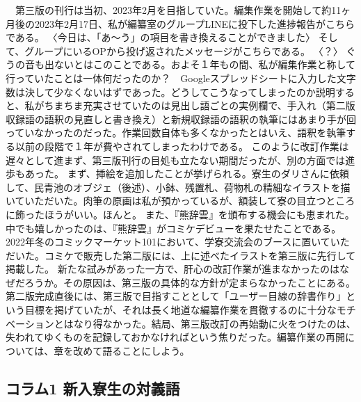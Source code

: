 　第三版の刊行は当初、2023年2月を目指していた。編集作業を開始して約11ヶ月後の2023年2月17日、私が編纂室のグループLINEに投下した進捗報告がこちらである。
〈今日は、「あ〜う」の項目を書き換えることができました〉
そして、グループにいるOPから投げ返されたメッセージがこちらである。
〈？〉
ぐうの音も出ないとはこのことである。およそ１年もの間、私が編集作業と称して行っていたことは一体何だったのか？　Googleスプレッドシートに入力した文字数は決して少なくないはずであった。どうしてこうなってしまったのか説明すると、私がちまちま充実させていたのは見出し語ごとの実例欄で、手入れ（第二版収録語の語釈の見直しと書き換え）と新規収録語の語釈の執筆にはあまり手が回っていなかったのだった。作業回数自体も多くなかったとはいえ、語釈を執筆する以前の段階で１年が費やされてしまったわけである。
このように改訂作業は遅々として進まず、第三版刊行の目処も立たない期間だったが、別の方面では進歩もあった。
まず、挿絵を追加したことが挙げられる。寮生のダリさんに依頼して、民青池のオブジェ（後述）、小鉢、残置札、荷物札の精細なイラストを描いていただいた。肉筆の原画は私が預かっているが、額装して寮の目立つところに飾ったほうがいい。ほんと。
また、『熊辞雲』を頒布する機会にも恵まれた。中でも嬉しかったのは、『熊辞雲』がコミケデビューを果たせたことである。2022年冬のコミックマーケット101において、学寮交流会のブースに置いていただいた。コミケで販売した第二版には、上に述べたイラストを第三版に先行して掲載した。
新たな試みがあった一方で、肝心の改訂作業が進まなかったのはなぜだろうか。その原因は、第三版の具体的な方針が定まらなかったことにある。第二版完成直後には、第三版で目指すこととして「ユーザー目線の辞書作り」という目標を掲げていたが、それは長く地道な編纂作業を貫徹するのに十分なモチベーションとはなり得なかった。結局、第三版改訂の再始動に火をつけたのは、失われてゆくものを記録しておかなければという焦りだった。編纂作業の再開については、章を改めて語ることにしよう。

\subsection{コラム1 新入寮生の対義語}


